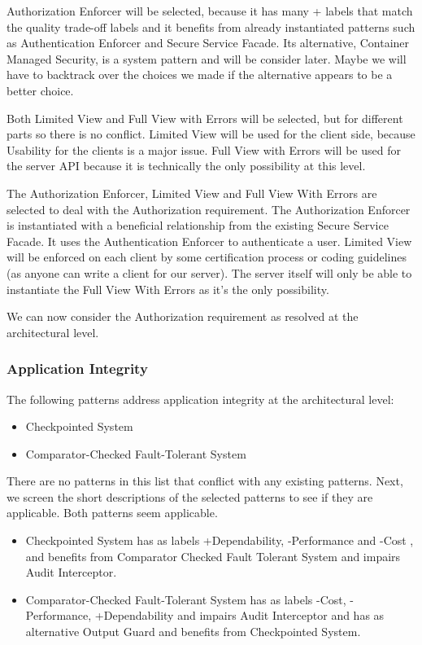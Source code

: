 \documentclass[a4paper,11pt]{report}
\begin{document}
Authorization Enforcer will be selected, because it has many + labels that match the quality trade-off labels and
it benefits from already instantiated patterns such as Authentication Enforcer and Secure Service Facade. Its
alternative, Container Managed Security, is a system pattern and will be consider later. Maybe we will have to
backtrack over the choices we made if the alternative appears to be a better choice.

Both Limited View and Full View with Errors will be selected, but for different parts so there is no conflict.
Limited View will be used for the client side, because Usability for the clients is a major issue. Full View with
Errors will be used for the server API because it is technically the only possibility at this level.

The Authorization Enforcer, Limited View and Full View With Errors are selected to deal with the Authorization requirement. The Authorization Enforcer is instantiated with a beneficial relationship from the existing Secure Service Facade. It uses the Authentication Enforcer to authenticate a user. Limited View will be enforced on each client by some certification process or coding guidelines (as anyone can write a client for our server). The server itself will only be able to instantiate the Full View With Errors as it's the only possibility.

We can now consider the Authorization requirement as resolved at the architectural level.

\subsubsection{Application Integrity}
\label{ArchitecturalApplicationIntegrity}
The following patterns address application integrity at the architectural level:
\begin{itemize}
\item Checkpointed System
\item Comparator-Checked Fault-Tolerant System
\end{itemize}

There are no patterns in this list that conflict with any existing patterns.
Next, we screen the short descriptions of the selected patterns to see if they are applicable. Both patterns seem
applicable.

\begin{itemize}
\item Checkpointed System has as labels +Dependability, -Performance and -Cost , and benefits from Comparator Checked
 Fault Tolerant System and impairs Audit Interceptor.

\item Comparator-Checked Fault-Tolerant System has as labels -Cost, -Performance, +Dependability and impairs Audit
Interceptor and has as alternative Output Guard and benefits from Checkpointed System.
\end{itemize}
\end{document}
